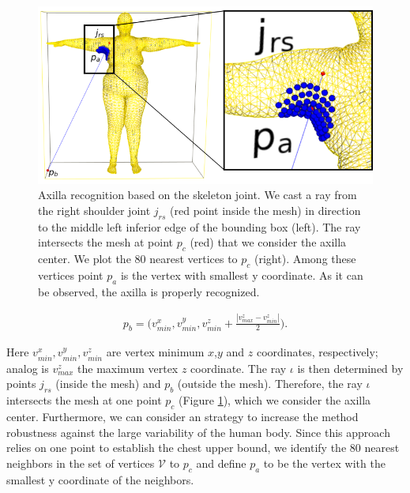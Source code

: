 \documentclass[runningheads, orivec]{llncs}
\begin{document}
\begin{figure}[t]
	\begin{center}
		\includegraphics[width=\linewidth]{axilla_recognition_80_NN.png}
	\end{center}
	\caption{Axilla recognition based on the skeleton joint. We cast a ray from 
		the right shoulder joint $j_{rs}$ (red point inside the mesh) in direction to the middle left 
		inferior edge of the bounding box (left). The ray intersects the mesh 
		at point $p_c$ (red) that we consider the axilla center. We plot the 80 
		nearest vertices to $p_c$ (right). Among these vertices point $p_a$ is the vertex 
		with smallest y coordinate. As it can be observed, the axilla is 
		properly recognized.}
	\label{fig:axilla-recognition}
\end{figure}

\begin{align}
p_b = \bigg(v^x_{min}, v^y_{min}, v^z_{min} + 
\frac{|v^z_{max} - v^z_{min}|}{2}\bigg).
\end{align}

Here $v^x_{min}, v^y_{min}, v^z_{min}$ are vertex minimum $x$,$y$ and $z$ 
coordinates, respectively; analog is $v^z_{max}$ the maximum vertex $z$ 
coordinate. The ray 
$\iota$ is then determined by points $j_{rs}$ (inside the mesh) and $p_b$ 
(outside the mesh). Therefore, the ray $\iota$ intersects the mesh at one point 
$p_c$ (Figure \ref{fig:axilla-recognition}), which we consider the axilla 
center. Furthermore, we can consider an strategy to increase the method 
robustness against the large variability of the human body. Since this approach 
relies on one point to establish the chest upper bound, we identify the 80 
nearest neighbors in the set of vertices $\mathcal{V}$ to $p_c$ and define 
$p_a$ to be the vertex with the smallest y coordinate of the neighbors.  
\end{document}
